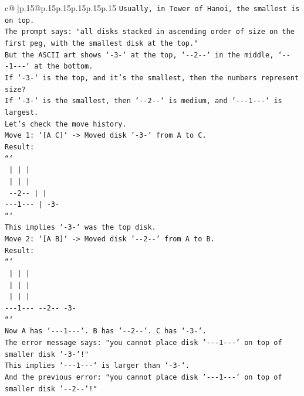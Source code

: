 \documentclass{article}
\begin{document}
{\begin{supertabular}{c@{$\;$}|p{.15\linewidth}@{}p{.15\linewidth}p{.15\linewidth}p{.15\linewidth}p{.15\linewidth}p{.15\linewidth}}
{{{\texttt{Usually, in Tower of Hanoi, the smallest is on top.} \\
\texttt{The prompt says: "all disks stacked in ascending order of size on the first peg, with the smallest disk at the top."} \\
\texttt{But the ASCII art shows `{-}3{-}` at the top, `{-}{-}2{-}{-}` in the middle, `{-}{-}{-}1{-}{-}{-}` at the bottom.} \\
\texttt{If `{-}3{-}` is the top, and it's the smallest, then the numbers represent size?} \\
\texttt{If `{-}3{-}` is the smallest, then `{-}{-}2{-}{-}` is medium, and `{-}{-}{-}1{-}{-}{-}` is largest.} \\
\texttt{Let's check the move history.} \\
\texttt{Move 1: `{[}A C{]}` {-}> Moved disk '{-}3{-}' from A to C.} \\
\texttt{Result:} \\
\texttt{```} \\
\texttt{   |       |       |   } \\
\texttt{   |       |       |   } \\
\texttt{ {-}{-}2{-}{-}     |       |   } \\
\texttt{{-}{-}{-}1{-}{-}{-}    |      {-}3{-}  } \\
\texttt{```} \\
\texttt{This implies `{-}3{-}` was the top disk.} \\
\texttt{Move 2: `{[}A B{]}` {-}> Moved disk '{-}{-}2{-}{-}' from A to B.} \\
\texttt{Result:} \\
\texttt{```} \\
\texttt{   |       |       |   } \\
\texttt{   |       |       |   } \\
\texttt{   |       |       |   } \\
\texttt{{-}{-}{-}1{-}{-}{-}  {-}{-}2{-}{-}    {-}3{-}  } \\
\texttt{```} \\
\texttt{Now A has `{-}{-}{-}1{-}{-}{-}`. B has `{-}{-}2{-}{-}`. C has `{-}3{-}`.} \\
\texttt{The error message says: "you cannot place disk '{-}{-}{-}1{-}{-}{-}' on top of smaller disk '{-}3{-}'!"} \\
\texttt{This implies `{-}{-}{-}1{-}{-}{-}` is larger than `{-}3{-}`.} \\
\texttt{And the previous error: "you cannot place disk '{-}{-}{-}1{-}{-}{-}' on top of smaller disk '{-}{-}2{-}{-}'!"} \\
}}}
\end{supertabular}}
\end{document}
